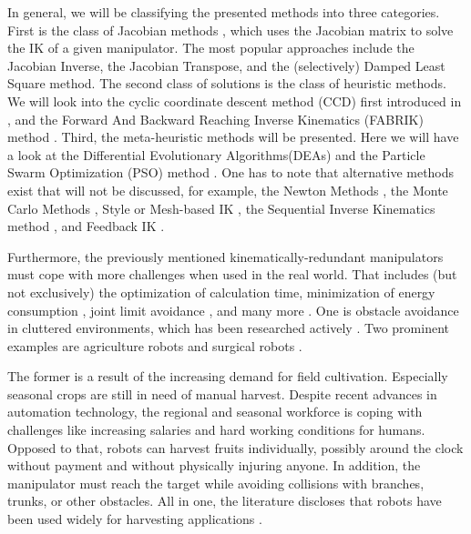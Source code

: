 \documentclass[conference]{IEEEtran}
\begin{document}
In general, we will be classifying the presented methods into three categories. First is the class of Jacobian methods \cite{springer_Kinematics}, which uses the Jacobian matrix to solve the IK of a given manipulator. The most popular approaches include the Jacobian Inverse, the Jacobian Transpose, and the (selectively) Damped Least Square method.
The second class of solutions is the class of heuristic methods. We will look into the cyclic coordinate descent method (CCD) first introduced in \cite{wang_combined_1991}, and the Forward And Backward Reaching Inverse Kinematics (FABRIK) method \cite{aristidou_fabrik_2011}. Third, the meta-heuristic methods will be presented. Here we will have a look at the Differential Evolutionary Algorithms(DEAs)\cite{zhang_research_2021} and the Particle Swarm Optimization (PSO) method \cite{yiyang_general_2021}.
One has to note that alternative methods exist that will not be discussed, for example, the Newton Methods \cite{fletcher_practical_2000}, the Monte Carlo Methods \cite{kwan_wu_chin_closed-form_1997}, Style or Mesh-based IK \cite{grochow_style-based_2004} \cite{sumner_mesh-based_2005}, the Sequential Inverse Kinematics method \cite{unzueta_full-body_2008} \cite{perales_predicting_2008}, and Feedback IK \cite{pechev_inverse_2008}.

Furthermore, the previously mentioned kinematically-redundant manipulators must cope with more challenges when used in the real world\cite{springer_motionPlanning_ObstacleAvoidance}. That includes (but not exclusively) the optimization of calculation time, minimization of energy consumption \cite{faraji_singularity-tolerant_2017}, joint limit avoidance \cite{goos_real-time_1998}, and many more \cite{kilin_experimental_2017} \cite{siciliano_kinematic_1990}. One is obstacle avoidance in cluttered environments, which has been researched actively \cite{maciejewski_obstacle_1985}. Two prominent examples are agriculture robots \cite{maciejewski_obstacle_1985} and surgical robots \cite{colan_concurrent_2023}.

The former is a result of the increasing demand for field cultivation. Especially seasonal crops are still in need of manual harvest. Despite recent advances in automation technology, the regional and seasonal workforce is coping with challenges like increasing salaries and hard working conditions for humans. Opposed to that, robots can harvest fruits individually, possibly around the clock without payment\cite{silwal_design_2017} \cite{pedersen_agricultural_2006} and without physically injuring anyone. In addition, the manipulator must reach the target while avoiding collisions with branches, trunks, or other obstacles. All in one, the literature discloses that robots have been used widely for harvesting applications \cite{belforte_robot_2006} \cite{hayashi_evaluation_2010} \cite{agricultural_2023}.
\end{document}

